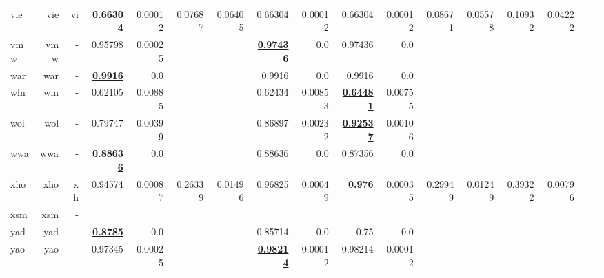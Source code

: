 \documentclass[11pt]{article}
\begin{document}
\begin{table*}[h]
{\begin{tabular}{lrrrrrrrrrrrrrrrr}
vie         & vie         & vi         & \textbf{\underline{0.66304}}         & 0.00012         & 0.07687         & 0.06405         & 0.66304         & 0.00012         & 0.66304         & 0.00012         & 0.08671         & 0.05578         & \underline{0.10932}         & 0.04222         \\
vmw         & vmw         & -         & 0.95798         & 0.00025         &          &          & \textbf{\underline{0.97436}}         & 0.0         & 0.97436         & 0.0         &          &          &          &          \\
war         & war         & -         & \textbf{\underline{0.9916}}         & 0.0         &          &          & 0.9916         & 0.0         & 0.9916         & 0.0         &          &          &          &          \\
wln         & wln         & -         & 0.62105         & 0.00885         &          &          & 0.62434         & 0.00853         & \textbf{\underline{0.64481}}         & 0.00755         &          &          &          &          \\
wol         & wol         & -         & 0.79747         & 0.00399         &          &          & 0.86897         & 0.00232         & \textbf{\underline{0.92537}}         & 0.00106         &          &          &          &          \\
wwa         & wwa         & -         & \textbf{\underline{0.88636}}         & 0.0         &          &          & 0.88636         & 0.0         & 0.87356         & 0.0         &          &          &          &          \\
xho         & xho         & xh         & 0.94574         & 0.00087         & 0.26339         & 0.01496         & 0.96825         & 0.00049         & \textbf{\underline{0.976}}         & 0.00035         & 0.29949         & 0.01249         & \underline{0.39322}         & 0.00796         \\
xsm         & xsm         & -         &          &          &          &          &          &          &          &          &          &          &          &          \\
yad         & yad         & -         & \textbf{\underline{0.8785}}         & 0.0         &          &          & 0.85714         & 0.0         & 0.75         & 0.0         &          &          &          &          \\
yao         & yao         & -         & 0.97345         & 0.00025         &          &          & \textbf{\underline{0.98214}}         & 0.00012         & 0.98214         & 0.00012         &          &          &          &          \\

\end{tabular}}
\end{table*}
\end{document}
